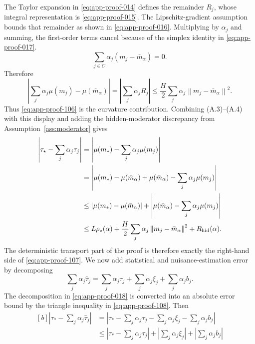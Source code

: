\documentclass[11pt]{article}
\numberwithin{equation}{section}
\newcommand{\1}{\mathbf 1}
\newcommand{\norm}[1]{\left\lVert #1\right\rVert}
\newcommand{\abs}[1]{\left\lvert #1\right\rvert}
\begin{document}
The Taylor expansion in \eqref{eq:app-proof-014} defines the remainder
\(R_j\), whose integral representation is \eqref{eq:app-proof-015}.  The
Lipschitz-gradient assumption bounds that remainder as shown in
\eqref{eq:app-proof-016}.
Multiplying by \(\alpha_j\) and summing, the first-order terms cancel because
of the simplex identity in \eqref{eq:app-proof-017}.
\begin{equation}
\label{eq:app-proof-017}
\sum_{j\in C}\alpha_j(m_j-\bar m_\alpha)=0.
\end{equation}
Therefore
\begin{equation}
\label{eq:app-proof-106}
  \abs{\sum_j\alpha_j\mu(m_j)-\mu(\bar m_\alpha)}=\abs{\sum_{j}\alpha_jR_j}
  \le
  \frac{H}{2}\sum_j\alpha_j\norm{m_j-\bar m_\alpha}^2.
\end{equation}
Thus \eqref{eq:app-proof-106} is the curvature contribution.  Combining
(A.3)--(A.4) with this display and adding the hidden-moderator discrepancy
from Assumption~\ref{ass:moderator} gives
\begin{equation}
\label{eq:app-proof-107}
\begin{aligned}[b]
  \abs{\tau_\star-\sum_j\alpha_j\tau_j}
  &=\abs{\mu(m_*)-\sum_j\alpha_j\mu(m_j)}\\
  &=\abs{\mu(m_*)-\mu(\bar{m}_{\alpha})+\mu(\bar{m}_{\alpha})-\sum_j\alpha_j\mu(m_j)}\\
  &\leq \abs{\mu(m_*)-\mu(\bar{m}_{\alpha})}+\abs{\mu(\bar{m}_{\alpha})-\sum_j\alpha_j\mu(m_j)}\\
  &\le
  L\rho_\star(\alpha)
  +\frac{H}{2}\sum_j\alpha_j\norm{m_j-\bar m_\alpha}^2
  +R_{\rm hid}(\alpha).
\end{aligned}
\end{equation}
The deterministic transport part of the proof is therefore exactly the
right-hand side of \eqref{eq:app-proof-107}.  We now add statistical and
nuisance-estimation error by decomposing
\begin{equation}
\label{eq:app-proof-018}
\sum_j\alpha_j\widehat\tau_j
  =\sum_j\alpha_j\tau_j+
    \sum_j\alpha_j\xi_j+
    \sum_j\alpha_jb_j.
\end{equation}
The decomposition in \eqref{eq:app-proof-018} is converted into an absolute
error bound by the triangle inequality in \eqref{eq:app-proof-108}.
Then
\begin{equation}
\label{eq:app-proof-108}
\begin{aligned}[b]
\abs{\tau_*-\sum_j\alpha_j\widehat\tau_j}
&=\abs{\tau_*-\sum_j\alpha_j\tau_j-\sum_j\alpha_j\xi_j-\sum_j\alpha_jb_j}\\
&\leq \abs{\tau_*-\sum_j\alpha_j\tau_j}+\abs{\sum_j\alpha_j\xi_j}+\abs{\sum_j\alpha_jb_j}
\end{aligned}
\end{equation}
\end{document}
